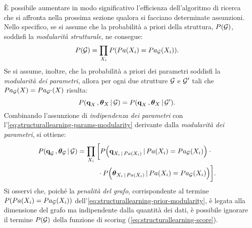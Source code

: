 \`E possibile aumentare in modo significativo l'efficienza dell'algoritmo di ricerca che si affronta nella prossima sezione qualora si facciano determinate assunzioni. Nello specifico, se si assume che la probabilità a priori della struttura, $P(\mathcal{G})$, soddisfi la \emph{modularità strutturale}, ne consegue:
\begin{equation}\label{eq:structurallearning-prior-modularity}
P(\mathcal{G})=\prod_{\mathnormal{X}_i} P(Pa(\mathnormal{X}_i) = Pa_{\mathcal{G}}(\mathnormal{X}_i))\text{.}
\end{equation}
Se si assume, inoltre, che la probabilità a priori dei parametri soddisfi la \emph{modularità dei parametri}, allora per ogni due strutture $\mathcal{G}$ e $\mathcal{G}^\prime$ tali che $Pa_{\mathcal{G}}(\mathnormal{X}) = Pa_{\mathcal{G}^\prime}(\mathnormal{X})$ risulta:
\begin{equation}\label{eq:structurallearning-params-modularity}
P(\boldsymbol{\textbf{\text{q}}}_{\mathnormal{X}}\,,\boldsymbol{\textbf{\text{$\theta$}}}_{\mathnormal{X}}\,\arrowvert\,\mathcal{G}) = P(\boldsymbol{\textbf{\text{q}}}_{\mathnormal{X}}\,,\boldsymbol{\textbf{\text{$\theta$}}}_{\mathnormal{X}}\,\arrowvert\,\mathcal{G}^\prime)\text{.}
\end{equation}
Combinando l'assunzione di \emph{indipendenza dei parametri} con l'\autoref{eq:structurallearning-params-modularity} derivante dalla \emph{modularità dei parametri}, si ottiene:
\begin{align}\label{eq:structurallearning-params-posterior}
P(\boldsymbol{\textbf{\text{q}}}_{\mathcal{G}}\,,\boldsymbol{\textbf{\text{$\theta$}}}_{\mathcal{G}}\,\arrowvert\,\mathcal{G}) &= \prod_{\mathnormal{X}_i} \bigg[ P\Big(\boldsymbol{\textbf{\text{q}}}_{\mathnormal{X}_i\,\arrowvert\,Pa(\mathnormal{X}_i)}\,\arrowvert\,Pa(\mathnormal{X}_i)=Pa_{\mathcal{G}}(\mathnormal{X}_i)\Big) \cdot \bigg.\nonumber\\
& \quad \bigg.{} \qquad \cdot P\Big(\boldsymbol{\textbf{\text{$\theta$}}}_{\mathnormal{X}_i\,\arrowvert\,Pa(\mathnormal{X}_i)}\,\arrowvert\,Pa(\mathnormal{X}_i)=Pa_{\mathcal{G}}(\mathnormal{X}_i)\Big) \bigg]\text{.}
\end{align}
Si osservi che, poiché la \emph{penalità del grafo}, corrispondente al termine $P(Pa(\mathnormal{X}_i) = Pa_{\mathcal{G}}(\mathnormal{X}_i))$ dell'\autoref{eq:structurallearning-prior-modularity}, è legata alla dimensione del grafo ma indipendente dalla quantità dei dati, è possibile ignorare il termine $P(\mathcal{G})$ della funzione di scoring (\autoref{eq:structurallearning-score}).

